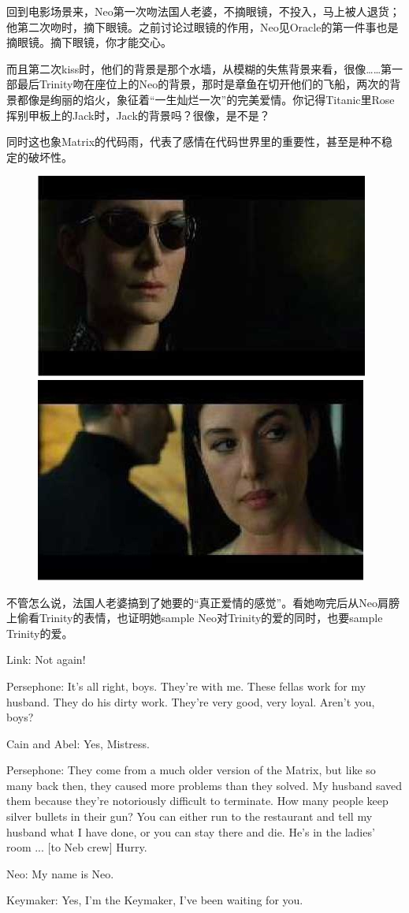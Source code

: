 \documentclass[UTF8]{ctexart}
\newenvironment{myquote}{\color{green} \setlength{\leftskip}{6em} \setlength{\rightskip}{4em} \setlength{\parindent}{-2em}}{\par}
\begin{document}
回到电影场景来，Neo第一次吻法国人老婆，不摘眼镜，不投入，马上被人退货；他第二次吻时，摘下眼镜。之前讨论过眼镜的作用，Neo见Oracle的第一件事也是摘眼镜。摘下眼镜，你才能交心。

而且第二次kiss时，他们的背景是那个水墙，从模糊的失焦背景来看，很像……第一部最后Trinity吻在座位上的Neo的背景，那时是章鱼在切开他们的飞船，两次的背景都像是绚丽的焰火，象征着“一生灿烂一次”的完美爱情。你记得Titanic里Rose挥别甲板上的Jack时，Jack的背景吗？很像，是不是？

同时这也象Matrix的代码雨，代表了感情在代码世界里的重要性，甚至是种不稳定的破坏性。

\begin{figure}[htb]
\centering
\includegraphics[width=0.45\linewidth]{fig/read_reloaded-107}
\includegraphics[width=0.45\linewidth]{fig/read_reloaded-107-1}
\end{figure}

不管怎么说，法国人老婆搞到了她要的“真正爱情的感觉”。看她吻完后从Neo肩膀上偷看Trinity的表情，也证明她sample Neo对Trinity的爱的同时，也要sample Trinity的爱。

\begin{myquote}
Link: Not again!

Persephone: It's all right, boys. They're with me. These fellas work for my husband. They do his dirty work. They're very good, very loyal. Aren't you, boys?

Cain and Abel: Yes, Mistress.

Persephone: They come from a much older version of the Matrix, but like so many back then, they caused more problems than they solved. My husband saved them because they're notoriously difficult to terminate. How many people keep silver bullets in their gun? You can either run to the restaurant and tell my husband what I have done, or you can stay there and die. He's in the ladies' room ... [to Neb crew] Hurry.

Neo: My name is Neo.

Keymaker: Yes, I'm the Keymaker, I've been waiting for you.
\end{myquote}
\end{document}
